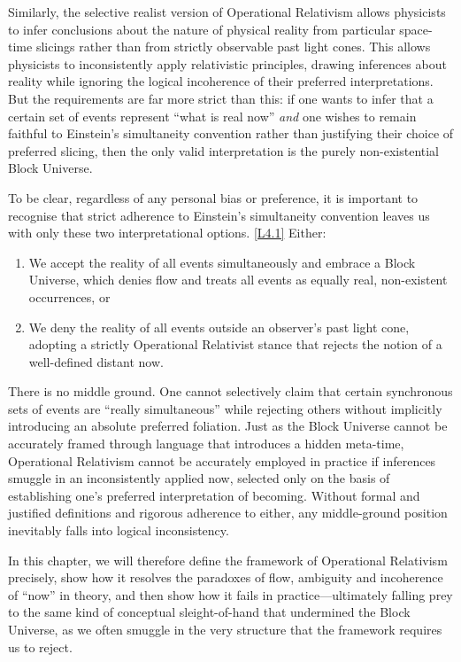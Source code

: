 \documentclass[12pt]{book}
\newcounter{logicanchor}
\newenvironment{logicanchorenv}[1]{\refstepcounter{logicanchor}\label{#1}}{}
\newcommand{\logiclink}[2]{\begin{logicanchorenv}{logic:#1}\end{logicanchorenv}\hyperref[appendix:#1]{[#1]}\xspace}
\begin{document}
Similarly, the selective realist version of Operational Relativism allows physicists to infer conclusions about the nature of physical reality from particular space-time slicings rather than from strictly observable past light cones. This allows physicists to inconsistently apply relativistic principles, drawing inferences about reality while ignoring the logical incoherence of their preferred interpretations. But the requirements are far more strict than this: if one wants to infer that a certain set of events represent ``what is real now'' \textit{and} one wishes to remain faithful to Einstein's simultaneity convention rather than justifying their choice of preferred slicing, then the only valid interpretation is the purely non-existential Block Universe.

To be clear, regardless of any personal bias or preference, it is important to recognise that strict adherence to Einstein's simultaneity convention leaves us with only these two interpretational options. \logiclink{L4.1}{} Either:
\begin{enumerate}
    \item We accept the reality of all events simultaneously and embrace a Block Universe, which denies flow and treats all events as equally real, non-existent occurrences, or
    \item We deny the reality of all events outside an observer's past light cone, adopting a strictly Operational Relativist stance that rejects the notion of a well-defined distant now.
\end{enumerate}

There is no middle ground. One cannot selectively claim that certain synchronous sets of events are ``really simultaneous'' while rejecting others without implicitly introducing an absolute preferred foliation. Just as the Block Universe cannot be accurately framed through language that introduces a hidden meta-time, Operational Relativism cannot be accurately employed in practice if inferences smuggle in an inconsistently applied now, selected only on the basis of establishing one's preferred interpretation of becoming. Without formal and justified definitions and rigorous adherence to either, any middle-ground position inevitably falls into logical inconsistency.

In this chapter, we will therefore define the framework of Operational Relativism precisely, show how it resolves the paradoxes of flow, ambiguity and incoherence of ``now'' in theory, and then show how it fails in practice---ultimately falling prey to the same kind of conceptual sleight-of-hand that undermined the Block Universe, as we often smuggle in the very structure that the framework requires us to reject.
\end{document}
